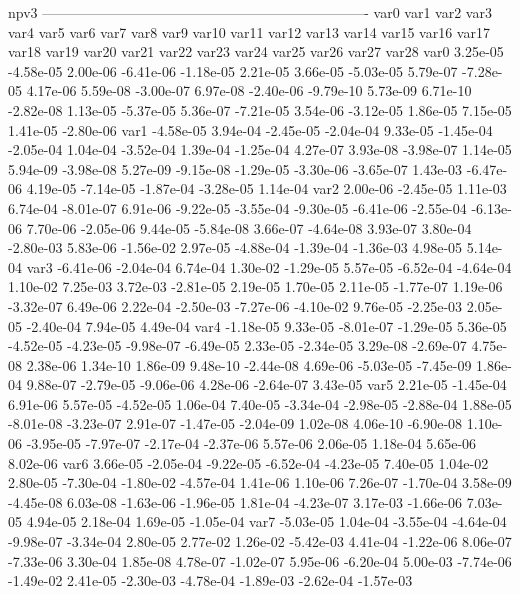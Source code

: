npv3
----------------------------------------------------------------------
var0 var1 var2 var3 var4 var5 var6 var7 var8 var9 var10 var11 var12 var13 var14 var15 var16 var17 var18 var19 var20 var21 var22 var23 var24 var25 var26 var27 var28 
var0  3.25e-05 -4.58e-05  2.00e-06 -6.41e-06 -1.18e-05  2.21e-05  3.66e-05 -5.03e-05  5.79e-07 -7.28e-05  4.17e-06  5.59e-08 -3.00e-07  6.97e-08 -2.40e-06 -9.79e-10  5.73e-09  6.71e-10 -2.82e-08  1.13e-05 -5.37e-05  5.36e-07 -7.21e-05  3.54e-06 -3.12e-05  1.86e-05  7.15e-05  1.41e-05 -2.80e-06
var1 -4.58e-05  3.94e-04 -2.45e-05 -2.04e-04  9.33e-05 -1.45e-04 -2.05e-04  1.04e-04 -3.52e-04  1.39e-04 -1.25e-04  4.27e-07  3.93e-08 -3.98e-07  1.14e-05  5.94e-09 -3.98e-08  5.27e-09 -9.15e-08 -1.29e-05 -3.30e-06 -3.65e-07  1.43e-03 -6.47e-06  4.19e-05 -7.14e-05 -1.87e-04 -3.28e-05  1.14e-04
var2  2.00e-06 -2.45e-05  1.11e-03  6.74e-04 -8.01e-07  6.91e-06 -9.22e-05 -3.55e-04 -9.30e-05 -6.41e-06 -2.55e-04 -6.13e-06  7.70e-06 -2.05e-06  9.44e-05 -5.84e-08  3.66e-07 -4.64e-08  3.93e-07  3.80e-04 -2.80e-03  5.83e-06 -1.56e-02  2.97e-05 -4.88e-04 -1.39e-04 -1.36e-03  4.98e-05  5.14e-04
var3 -6.41e-06 -2.04e-04  6.74e-04  1.30e-02 -1.29e-05  5.57e-05 -6.52e-04 -4.64e-04  1.10e-02  7.25e-03  3.72e-03 -2.81e-05  2.19e-05  1.70e-05  2.11e-05 -1.77e-07  1.19e-06 -3.32e-07  6.49e-06  2.22e-04 -2.50e-03 -7.27e-06 -4.10e-02  9.76e-05 -2.25e-03  2.05e-05 -2.40e-04  7.94e-05  4.49e-04
var4 -1.18e-05  9.33e-05 -8.01e-07 -1.29e-05  5.36e-05 -4.52e-05 -4.23e-05 -9.98e-07 -6.49e-05  2.33e-05 -2.34e-05  3.29e-08 -2.69e-07  4.75e-08  2.38e-06  1.34e-10  1.86e-09  9.48e-10 -2.44e-08  4.69e-06 -5.03e-05 -7.45e-09  1.86e-04  9.88e-07 -2.79e-05 -9.06e-06  4.28e-06 -2.64e-07  3.43e-05
var5  2.21e-05 -1.45e-04  6.91e-06  5.57e-05 -4.52e-05  1.06e-04  7.40e-05 -3.34e-04 -2.98e-05 -2.88e-04  1.88e-05 -8.01e-08 -3.23e-07  2.91e-07 -1.47e-05 -2.04e-09  1.02e-08  4.06e-10 -6.90e-08  1.10e-06 -3.95e-05 -7.97e-07 -2.17e-04 -2.37e-06  5.57e-06  2.06e-05  1.18e-04  5.65e-06  8.02e-06
var6  3.66e-05 -2.05e-04 -9.22e-05 -6.52e-04 -4.23e-05  7.40e-05  1.04e-02  2.80e-05 -7.30e-04 -1.80e-02 -4.57e-04  1.41e-06  1.10e-06  7.26e-07 -1.70e-04  3.58e-09 -4.45e-08  6.03e-08 -1.63e-06 -1.96e-05  1.81e-04 -4.23e-07  3.17e-03 -1.66e-06  7.03e-05  4.94e-05  2.18e-04  1.69e-05 -1.05e-04
var7 -5.03e-05  1.04e-04 -3.55e-04 -4.64e-04 -9.98e-07 -3.34e-04  2.80e-05  2.77e-02  1.26e-02 -5.42e-03  4.41e-04 -1.22e-06  8.06e-07 -7.33e-06  3.30e-04  1.85e-08  4.78e-07 -1.02e-07  5.95e-06 -6.20e-04  5.00e-03 -7.74e-06 -1.49e-02  2.41e-05 -2.30e-03 -4.78e-04 -1.89e-03 -2.62e-04 -1.57e-03
